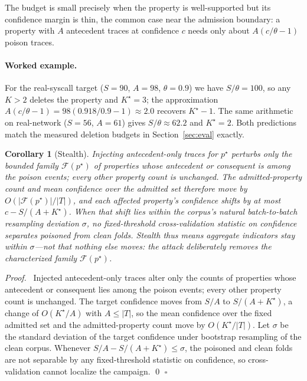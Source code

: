 \documentclass[runningheads]{llncs}
\newtheorem{cor}{Corollary}
\newenvironment{proof}{\par\noindent\textit{Proof.}\ }{\hfill$\square$\par}}{}
\begin{document}
The budget is small precisely when the property is well-supported but its
confidence margin is thin, the common case near the admission boundary: a
property with $A$ antecedent traces at confidence $c$ needs only about
$A(c/\theta-1)$ poison traces.

\paragraph{Worked example.}
For the real-syscall target ($S{=}90$, $A{=}98$, $\theta{=}0.9$) we have
$S/\theta=100$, so any $K>2$ deletes the property and $K^\star=3$; the
approximation $A(c/\theta-1)=98(0.918/0.9-1)\approx 2.0$ recovers $K^\star-1$.
The same arithmetic on real-network ($S{=}56$, $A{=}61$) gives $S/\theta\approx
62.2$ and $K^\star=2$. Both predictions match the measured deletion budgets in
Section~\ref{sec:eval} exactly.

\begin{cor}[Stealth]\label{cor:stealth}
Injecting antecedent-only traces for $p^\star$ perturbs \emph{only} the bounded
family $\mathcal{F}(p^\star)$ of properties whose antecedent or consequent is
among the poison events; every other property count is unchanged. The
admitted-property count and mean confidence over the admitted set therefore move
by $O(|\mathcal{F}(p^\star)|/|T|)$, and each affected property's confidence shifts
by at most $c-S/(A+K^\star)$. When that shift lies within the corpus's natural
batch-to-batch resampling deviation $\sigma$, no fixed-threshold cross-validation
statistic on confidence separates poisoned from clean folds. Stealth thus means
aggregate indicators stay within $\sigma$---not that nothing else moves: the
attack deliberately removes the characterized family $\mathcal{F}(p^\star)$.
\end{cor}
\begin{proof}
Injected antecedent-only traces alter only the counts of properties whose
antecedent or consequent lies among the poison events; every other property
count is unchanged. The target confidence moves from $S/A$ to $S/(A+K^\star)$, a
change of $O(K^\star/A)$ with $A\le|T|$, so the mean confidence over the fixed
admitted set and the admitted-property count move by $O(K^\star/|T|)$. Let
$\sigma$ be the standard deviation of the target confidence under bootstrap
resampling of the clean corpus. Whenever $S/A-S/(A+K^\star)\le\sigma$, the
poisoned and clean folds are not separable by any fixed-threshold statistic on
confidence, so cross-validation cannot localize the campaign. \qed
\end{proof}
\end{document}
